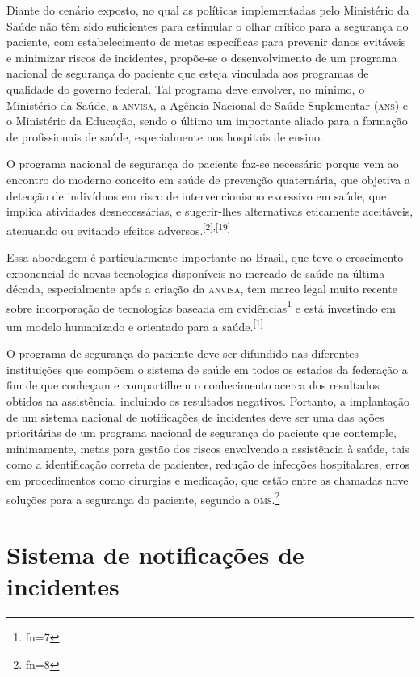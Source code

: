 \documentclass{article}
\makeatletter
\newcommand{\fn}{\afterassignment\fn@aux\count0=}
\newcommand{\fn@aux}{\csname fn\the\count0\endcsname}
\makeatother
\begin{document}
Diante do cenário exposto, no qual as políticas implementadas pelo Ministério da
Saúde não
têm sido suficientes para estimular o olhar crítico para a segurança do
paciente, com
estabelecimento de metas específicas para prevenir danos evitáveis e minimizar
riscos de
incidentes, propõe-se o desenvolvimento de um programa nacional de segurança do
paciente que
esteja vinculada aos programas de qualidade do governo federal. Tal programa
deve envolver,
no mínimo, o Ministério da Saúde, a \textsc{anvisa}, a Agência Nacional de Saúde
Suplementar (\textsc{ans}) e
o Ministério da Educação, sendo o último um importante aliado para a formação de
profissionais de saúde, especialmente nos hospitais de ensino.

O programa nacional de segurança do paciente faz-se necessário porque vem ao
encontro do
moderno conceito em saúde de prevenção quaternária, que objetiva a detecção de
indivíduos em
risco de intervencionismo excessivo em saúde, que implica atividades
desnecessárias, e
sugerir-lhes alternativas eticamente aceitáveis, atenuando ou evitando efeitos
adversos.\textsuperscript{[}\textsuperscript{2}\textsuperscript{]}\textsuperscript{,}\textsuperscript{[}\textsuperscript{19}\textsuperscript{]}

Essa abordagem é particularmente importante no Brasil, que teve o crescimento
exponencial
de novas tecnologias disponíveis no mercado de saúde na última década,
especialmente após a
criação da \textsc{anvisa}, tem marco legal muito recente sobre incorporação de
tecnologias baseada
em evidências\footnote{\fn7}
e está investindo em um modelo humanizado e orientado para a saúde.\textsuperscript{[}\textsuperscript{1}\textsuperscript{]}

O programa de segurança do paciente deve ser difundido nas diferentes
instituições que
compõem o sistema de saúde em todos os estados da federação a fim de que
conheçam e
compartilhem o conhecimento acerca dos resultados obtidos na assistência,
incluindo os
resultados negativos. Portanto, a implantação de um sistema nacional de
notificações de
incidentes deve ser uma das ações prioritárias de um programa nacional de
segurança do
paciente que contemple, minimamente, metas para gestão dos riscos envolvendo a
assistência à
saúde, tais como a identificação correta de pacientes, redução de infecções
hospitalares,
erros em procedimentos como cirurgias e medicação, que estão entre as chamadas
nove soluções
para a segurança do paciente, segundo a \textsc{oms}.\footnote{\fn8}

\section{Sistema de notificações de incidentes}
\end{document}
